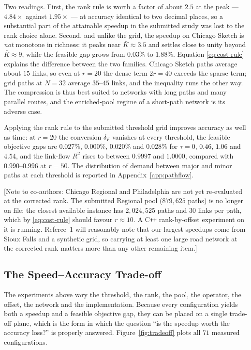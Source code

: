 \documentclass[11pt]{article}
\newcommand{\conote}[1]{{\color{red}\small\textsf{[Note to co-authors: #1]}}}
\begin{document}
Two readings. First, the rank rule is worth a factor of about $2.5$ at the peak --- $4.84
\times$ against $1.95\times$ --- at accuracy identical to two decimal places, so a
substantial part of the attainable speedup in the submitted study was lost to the rank
choice alone. Second, and unlike the grid, the speedup on Chicago Sketch is \emph{not}
monotone in richness: it peaks near $\bar K\approx3.5$ and settles close to unity beyond
$\bar K\approx9$, while the feasible gap grows from $0.03\%$ to $1.88\%$. Equation
\eqref{eq:cost-rule} explains the difference between the two families. Chicago Sketch paths
average about $15$ links, so even at $r=20$ the dense term $2r=40$ exceeds the sparse term;
grid paths at $N=32$ average $35$--$45$ links, and the inequality runs the other way. The
compression is thus best suited to networks with long paths and many parallel routes, and the
enriched-pool regime of a short-path network is its adverse case.

Applying the rank rule to the submitted threshold grid improves accuracy as well as time: at
$r=20$ the conversion $\delta_F$ vanishes at every threshold, the feasible objective gaps are
$0.027\%$, $0.000\%$, $0.020\%$ and $0.028\%$ for $\tau=0$, $0.46$, $1.06$ and $4.54$, and
the link-flow $R^2$ rises to between $0.9997$ and $1.0000$, compared with $0.990$--$0.996$ at
$r=50$. The distribution of demand between major and minor paths at each threshold is
reported in Appendix~\ref{app:pathflow}.

\conote{Chicago Regional and Philadelphia are not yet re-evaluated at the corrected rank. The
submitted Regional pool ($879{,}625$ paths) is no longer on file; the closest available
instance has $2{,}024{,}525$ paths and $30$ links per path, which by \eqref{eq:cost-rule}
should favour $r\approx10$. A C\texttt{++} rank-by-offset experiment on it is running.
Referee~1 will reasonably note that our largest speedups come from Sioux Falls and a synthetic
grid, so carrying at least one large road network at the corrected rank matters more than any
other remaining item.}


\subsection{The Speed--Accuracy Trade-off}
\label{sec:tradeoff}


The experiments above vary the threshold, the rank, the pool, the operator, the offset, the
network and the implementation. Because every configuration yields both a speedup and a
feasible objective gap, they can be placed on a single trade-off plane, which is the form in
which the question ``is the speedup worth the accuracy loss?'' is properly answered.
Figure~\ref{fig:tradeoff} plots all $71$ measured configurations.
\end{document}
